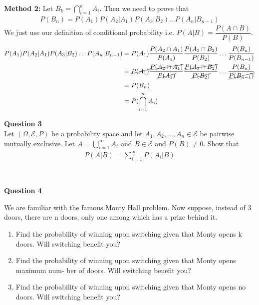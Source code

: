 \documentclass[addpoints]{exam}
\begin{document}
\begin{questions}
\begin{solution}
    \textbf{Method 2: }
    Let \(B_k = \bigcap_{i=1}^{k}A_i\).
    Then we need to prove that 
    \begin{align*}
        P(B_n) = P(A_1)P(A_2|A_1)P(A_3|B_2)\dots P(A_n|B_{n-1})
    \end{align*}
    We just use our definition of conditional probability i.e. \(P(A|B) = \dfrac{P(A\cap B)}{P(B)}\). 
    \begin{align*}
        P(A_1)P(A_2|A_1)P(A_3|B_2)\dots P(A_n|B_{n-1}) &= P(A_1)\frac{P(A_2\cap A_1)}{P(A_1)} \frac{P(A_3\cap B_2)}{P(B_2)}\dots \frac{P(B_n)}{P(B_{n-1})}\\ 
                                                       &=  \cancel{P(A_1)}\frac{\cancel{P(A_2\cap A_1)}}{\cancel{P(A_1)}} \frac{\cancel{P(A_3\cap B_2)}}{\cancel{P(B_2)}}\dots \frac{P(B_n)}{\cancel{P(B_{n-1})}}\\
                                                       &= P(B_n)\\ 
                                                       &= P(\bigcap_{i=1}^{n}A_i)
    \end{align*}
\end{solution} 

\question \textbf{ Question 3}\\
Let \((\Omega,\mathcal{E},P)\) be a probability space and let \(A_1,A_2,\dots,A_n \in \mathcal{E}\)
be pairwise mutually exclusive. Let \(A = \bigcup_{i=1}^{\infty}A_i\) and \(B \in \mathcal{E}\)
and \(P(B)\neq 0 \). Show that
\begin{align}
    P(A|B) = \sum_{i=1}^{\infty}P(A_i|B)
\end{align}

\begin{solution}\\
 
\end{solution}

\question \textbf{ Question 4}

We are familiar with the famous Monty Hall problem. Now suppose, instead of 3 doors, there
are n doors, only one among which has a prize behind it.
\begin{enumerate}[label=(\alph*)]
  \item Find the probability of winning upon switching given that Monty opens k doors. Will
switching benefit you?
 \item Find the probability of winning upon switching given that Monty opens maximum num-
ber of doors. Will switching benefit you?
    \item  Find the probability of winning upon switching given that Monty opens no doors. Will
switching benefit you?
\end{enumerate}
\begin{solution}\\
 

\end{solution}
\end{questions}
\end{document}
